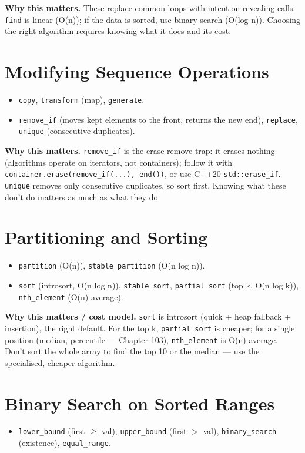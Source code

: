 \textbf{Why this matters.} These replace common loops with intention-revealing calls. \texttt{find} is linear (O(n)); if the data is sorted, use binary search (O(log n)). Choosing the right algorithm requires knowing what it does and its cost.

\section{Modifying Sequence Operations}
\begin{itemize}
\item \texttt{copy}, \texttt{transform} (map), \texttt{generate}.
\item \texttt{remove\_if} (moves kept elements to the front, returns the new end), \texttt{replace}, \texttt{unique} (consecutive duplicates).
\end{itemize}

\textbf{Why this matters.} \texttt{remove\_if} is the erase-remove trap: it erases nothing (algorithms operate on iterators, not containers); follow it with \texttt{container.erase(remove\_if(...), end())}, or use C++20 \texttt{std::erase\_if}. \texttt{unique} removes only consecutive duplicates, so sort first. Knowing what these don't do matters as much as what they do.

\section{Partitioning and Sorting}
\begin{itemize}
\item \texttt{partition} (O(n)), \texttt{stable\_partition} (O(n log n)).
\item \texttt{sort} (introsort, O(n log n)), \texttt{stable\_sort}, \texttt{partial\_sort} (top k, O(n log k)), \texttt{nth\_element} (O(n) average).
\end{itemize}

\textbf{Why this matters / cost model.} \texttt{sort} is introsort (quick + heap fallback + insertion), the right default. For the top k, \texttt{partial\_sort} is cheaper; for a single position (median, percentile --- Chapter 103), \texttt{nth\_element} is O(n) average. Don't sort the whole array to find the top 10 or the median --- use the specialised, cheaper algorithm.

\section{Binary Search on Sorted Ranges}
\begin{itemize}
\item \texttt{lower\_bound} (first $\geq$ val), \texttt{upper\_bound} (first $>$ val), \texttt{binary\_search} (existence), \texttt{equal\_range}.
\end{itemize}

